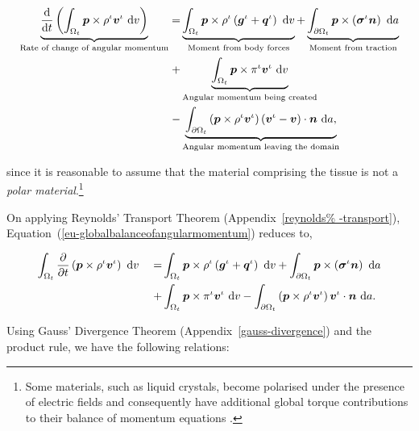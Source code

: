 \begin{equation}
\begin{split}
\underbrace{\frac{\mathrm{d}}{\mathrm{d}t}\left(\int_{\Omega_{t}} \mbox{\boldmath$ p$}
  \times \rho^{\iota} \mbox{\boldmath$ v$}^{\iota}\ \mathrm{d}v\right)}_{\text{Rate of
    change of angular momentum}} = & \underbrace{\int_{\Omega_{t}} \mbox{\boldmath$ p$}
  \times \rho^{\iota} \left(\mbox{\boldmath$ g$}^{\iota} +
  \mbox{\boldmath$ q$}^{\iota}\right)\ \mathrm{d}v}_{\text{Moment from body forces}} +
\underbrace{\int_{\partial \Omega_{t}} \mbox{\boldmath$ p$} \times
  \left(\mbox{\boldmath$\sigma$}^{\iota}\mbox{\boldmath$ n$}\right)\ \mathrm{d}a}_{\text{Moment from
    traction}}\\ + & \underbrace{\int_{\Omega_{t}} \mbox{\boldmath$ p$} \times
  \pi^{\iota}\mbox{\boldmath$ v$}^{\iota}\ \mathrm{d}v}_{\text{Angular momentum being
    created}} \\ - & \underbrace{\int_{\partial \Omega_{t}} \left(\mbox{\boldmath$ p$}
  \times \rho^{\iota} \mbox{\boldmath$ v$}^{\iota}\right) \left(\mbox{\boldmath$ v$}^{\iota} -
  \mbox{\boldmath$ v$}\right) \cdot \mbox{\boldmath$ n$}\ \mathrm{d}a,}_{\text{Angular momentum leaving
    the domain}}
\end{split}
\label{eu-globalbalanceofangularmomentum}
\end{equation}

\noindent since it is reasonable to assume that the material
comprising the tissue is not a {\em polar material}.\footnote{Some
  materials, such as liquid crystals, become polarised under the
  presence of electric fields and consequently have additional global
  torque contributions to their balance of momentum equations
  \citep{TruesdellNoll:65}.}

On applying Reynolds' Transport Theorem (Appendix~\ref{reynolds%
  -transport}), Equation~(\ref{eu-globalbalanceofangularmomentum})
reduces to,

\begin{equation*}
\begin{split}
\int_{\Omega_{t}} \frac{\partial}{\partial t}\left( \mbox{\boldmath$ p$} \times \rho^{\iota}
  \mbox{\boldmath$ v$}^{\iota}\right)\ \mathrm{d}v \quad =
& \int_{\Omega_{t}} \mbox{\boldmath$ p$} \times \rho^{\iota} \left(\mbox{\boldmath$ g$}^{\iota} +
  \mbox{\boldmath$ q$}^{\iota}\right)\ \mathrm{d}v
+ \int_{\partial \Omega_{t}}
  \mbox{\boldmath$ p$} \times \left(\mbox{\boldmath$\sigma$}^{\iota}\mbox{\boldmath$ n$}\right)\ \mathrm{d}a\\
+ & \int_{\Omega_{t}} \mbox{\boldmath$ p$} \times 
  \pi^{\iota}\mbox{\boldmath$ v$}^{\iota}\ \mathrm{d}v - \int_{\partial \Omega_{t}} \left(\mbox{\boldmath$ p$}
  \times \rho^{\iota} 
  \mbox{\boldmath$ v$}^{\iota}\right) \mbox{\boldmath$ v$}^{\iota} \cdot \mbox{\boldmath$ n$}\ \mathrm{d}a.
\end{split}
\end{equation*}

Using Gauss' Divergence Theorem (Appendix~\ref{gauss-divergence}) and
the product rule, we have the following relations:

